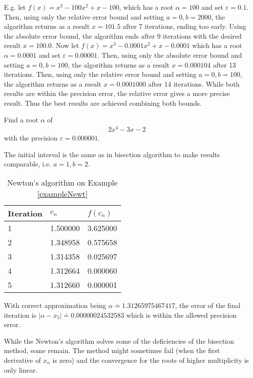\documentclass[
  digital, %
  notable,   %
  nolof,     %
  nolot,     %
	draft, %
]{fithesis3}
\begin{document}
E.g. let $f(x)=x^3-100x^2+x-100$, which has a root $\alpha=100$ and set $\varepsilon=0.1$. Then, using only the relative error bound and setting $a=0, b=2000$, the algorithm returns as a result $x=101.5$ after 7 iterations, ending too early. Using the absolute error bound, the algorithm ends after 9 iterations with the desired result $x=100.0$. 
Now let $f(x)=x^3-0.0001x^2+x-0.0001$ which has a root $\alpha=0.0001$ and set $\varepsilon=0.00001$. Then, using only the absolute error bound and setting $a=0, b=100$, the algorithm returns as a result $x=0.000104$ after 13 iterations. Then, using only the relative error bound and setting $a=0, b=100$, the algorithm returns as a result $x=0.0001000$ after 14 iterations. While both results are within the precision error, the relative error gives a more precise result. Thus the best results are achieved combining both bounds.
\begin{example}
\label{exampleNewt}
Find a root $\alpha$ of 
\begin{align}
      2x^{4} - 3x - 2
\end{align}
with the precision $\varepsilon = 0.000001$.
\end{example}
The initial interval is the same as in bisection algorithm to make results comparable, i.e. $a=1, b=2$.
\FloatBarrier
\begin{table}[H]
  \begin{tabular*}{\textwidth}{lll}
    \toprule
    Iteration & $c_{n}$ & $f(c_{n})$\\
    \midrule
			1 & 1.500000 & 3.625000 \\
			2 & 1.348958 & 0.575658 \\
			3 & 1.314358 & 0.025697 \\
			4 & 1.312664 & 0.000060 \\
			5 & 1.312660 & 0.000001 \\
    \bottomrule
  \end{tabular*}
  \caption{Newton's algorithm on Example \ref{exampleNewt}}
  \label{tab:newt}
\end{table}

With correct approximation being $\alpha \doteq 1.31265975467417$, the error of the final iteration is $|\alpha - x_{5}|\doteq0.00000024532583$ which is within the allowed precision error.

While the Newton's algorithm solves some of the deficiencies of the bisection method, some remain. The method might sometimes fail (when the first derivative of $x_{n}$ is zero) and the convergence for the roots of higher multiplicity is only linear.
\end{document}
